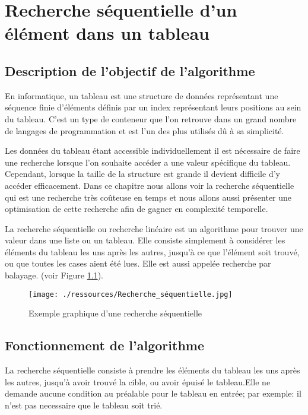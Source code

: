 \chapter{Recherche séquentielle d'un élément dans un tableau}

\section{Description de l'objectif de l'algorithme}
En informatique, un tableau est une structure de données représentant une séquence finie d'éléments définis par un index représentant leurs positions au sein du tableau. C'est un type de conteneur que l'on retrouve dans un grand nombre de langages de programmation et est l'un des plus utilisés dû à sa simplicité.
\par
Les données du tableau étant accessible individuellement il est nécessaire de faire une recherche lorsque l'on souhaite accéder a une valeur spécifique du tableau. Cependant, lorsque la taille de la structure est grande il devient difficile d'y accéder efficacement. Dans ce chapitre nous allons voir la recherche séquentielle qui est une recherche très coûteuse en temps et nous allons aussi présenter une optimisation de cette recherche afin de gagner en complexité temporelle.
\par
La recherche séquentielle ou recherche linéaire est un algorithme pour trouver une valeur dans une liste ou un tableau. Elle consiste simplement à considérer les éléments du tableau les uns après les autres, jusqu'à ce que l'élément soit trouvé, ou que toutes les cases aient été lues. Elle est aussi appelée recherche par balayage. (voir Figure \ref{fig:recherche_sec}).

\begin{figure}[H]
    \centering
        \texttt{[image: ./ressources/Recherche\_séquentielle.jpg]}
        \caption{Exemple graphique d'une recherche séquentielle}
    \label{fig:recherche_sec}
\end{figure}

\section{Fonctionnement de l'algorithme}
La recherche séquentielle consiste à prendre les éléments du tableau les uns après les autres, jusqu'à avoir trouvé la cible, ou avoir épuisé le tableau.Elle ne demande aucune condition au préalable pour le tableau en entrée; par exemple: il n'est pas necessaire que le tableau soit trié.


